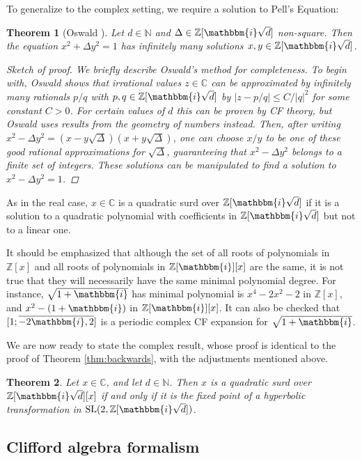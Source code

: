 \documentclass[reqno,10pt]{amsart}
\newcommand{\ii}{\mathbbm{i}}
\renewcommand{\C}{\mathbb{C}}
\newcommand{\Z}{\mathbb{Z}}
\newcommand{\N}{\mathbb{N}}
\newtheorem{thm}{Theorem}
\numberwithin{thm}{section}
\theoremstyle{definition}
\theoremstyle{definition}
\numberwithin{equation}{section}
\begin{document}
To generalize to the complex setting, we require a solution to Pell's Equation:

\begin{thm}[Oswald \cite{oswald2015diophantine}]
Let $d\in \N$ and $\Delta\in \Z[\ii\sqrt{d}]$ non-square. Then the equation $x^2+\Delta y^2=1$ has infinitely many solutions $x,y\in \Z[\ii\sqrt{d}]$.
\begin{proof}[Sketch of proof]
We briefly describe Oswald's method for completeness. To begin with, Oswald shows that irrational values $z\in \C$ can be approximated by infinitely many rationals $p/q$ with $p,q\in \Z[\ii\sqrt{d}]$ by $|z-p/q| \le C/|q|^2$ for some constant $C>0$. For certain values of $d$ this can be proven by CF theory, but Oswald uses results from the geometry of numbers instead. Then, after writing $x^2-\Delta y^2=(x-y\sqrt{\Delta })(x+y\sqrt{\Delta })$, one can choose $x/y$ to be one of these good rational approximations for $\sqrt{\Delta }$, guaranteeing that $x^2-\Delta y^2$ belongs to a finite set of integers. These solutions can be manipulated to find a solution to $x^2-\Delta y^2=1$. 
\end{proof}
\end{thm}

As in the real case, $x\in \C$ is a quadratic surd over $\Z[\ii \sqrt{d}]$ if it is a solution to a quadratic polynomial with coefficients in $\Z[\ii \sqrt{d}]$ but not to a linear one.

It should be emphasized that although the set of all roots of polynomials in $\mathbb{Z}[x]$ and all roots of polynomials in $\mathbb{Z}[\ii][x]$ are the same, it is not true that they will necessarily have the same minimal polynomial degree. For instance, $\sqrt{1+\ii}$ has minimal polynomial is $x^4-2x^2-2$ in $\mathbb{Z}[x]$, and $x^2-(1+\ii)$ in $\mathbb{Z}[\ii][x]$. It can also be checked that $[1;\overline{-2\ii,2}]$ is a periodic complex CF expansion for $\sqrt{1+\ii}$.

We are now ready to state the complex result, whose proof is identical to the proof of Theorem \ref{thm:backwards}, with the adjustments mentioned above.
\begin{thm}
Let $x\in\mathbb{C}$, and let $d\in \mathbb{N}$. Then $x$ is a quadratic surd over $\mathbb{Z}[\ii\sqrt{d}][x]$ if and only if it is the fixed point of a hyperbolic transformation in $\operatorname{SL}(2,\mathbb{Z}[\ii\sqrt{d}])$.
\end{thm}


\subsection{Clifford algebra formalism}\label{sec:Clifford}
\end{document}
